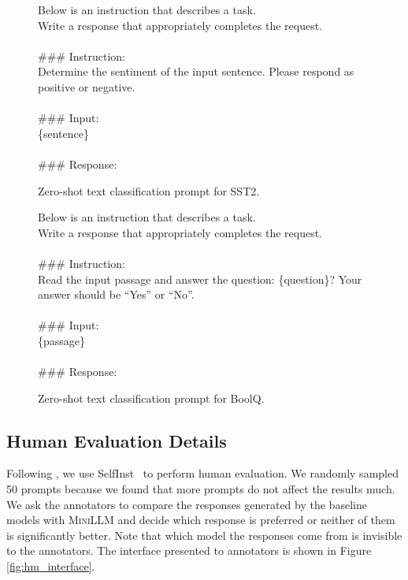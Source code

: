 \documentclass{article}
\begin{document}
\begin{figure}
    \begin{tcolorbox}
    Below is an instruction that describes a task. \\
    Write a response that appropriately completes the request. \\ \\
    \#\#\# Instruction: \\
    Determine the sentiment of the input sentence. Please respond as positive or negative. \\ \\
    \#\#\# Input: \\
    \{sentence\} \\ \\
    \#\#\# Response:
    \end{tcolorbox}
    \caption{Zero-shot text classification prompt for SST2.}
    \label{fig:prompt_sst2}
\end{figure}

\begin{figure}
    \begin{tcolorbox}
    Below is an instruction that describes a task. \\
    Write a response that appropriately completes the request. \\ \\
    \#\#\# Instruction: \\
    Read the input passage and answer the question: \{question\}? Your answer should be ``Yes'' or ``No''. \\ \\
    \#\#\# Input: \\
    \{passage\} \\ \\
    \#\#\# Response:
    \end{tcolorbox}
    \caption{Zero-shot text classification prompt for BoolQ.}
    \label{fig:prompt_boolq}
\end{figure}

\subsection{Human Evaluation Details}
\label{app:human_eval}
Following \cite{ITGPT4}, we use SelfInst~\citep{self_inst} to perform human evaluation. We randomly sampled 50 prompts because we found that more prompts do not affect the results much. We ask the annotators to compare the responses generated by the baseline models with \textsc{MiniLLM} and decide which response is preferred or neither of them is significantly better. Note that which model the responses come from is invisible to the annotators. The interface presented to annotators is shown in Figure \ref{fig:hm_interface}.
\end{document}
